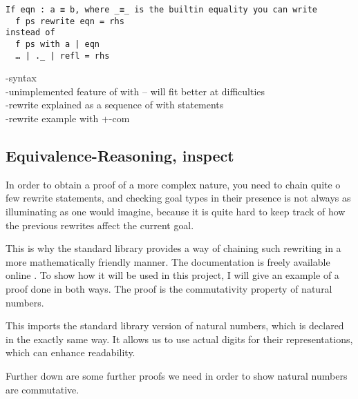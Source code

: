 \documentclass[12pt,twoside,notitlepage]{report}
\newcommand{\Conid}[1]{\mathit{#1}}
\newcommand{\Varid}[1]{\mathit{#1}}
\def\resethooks{%
  \global\let\SaveRestoreHook\empty
  \global\let\ColumnHook\empty}
\let\hspre\empty
\let\hspost\empty
\begin{document}
\begin{verbatim}
If eqn : a ≡ b, where _≡_ is the builtin equality you can write
  f ps rewrite eqn = rhs
instead of
  f ps with a | eqn
  … | ._ | refl = rhs
\end{verbatim}

-syntax\\
-unimplemented feature of with -- will fit better at difficulties\\
-rewrite explained as a sequence of with statements\\
-rewrite example with +-com

\subsection{Equivalence-Reasoning, inspect}

In order to obtain a proof of a more complex nature, you need to chain quite o few rewrite statements, and checking goal
types in their presence is not always as illuminating as one would imagine, because it is quite hard to keep track of
how the previous rewrites affect the current goal.

This is why the standard library provides a way of chaining such rewriting in a more mathematically friendly manner.
The documentation is freely available online \cite{agdadoc}. To show how it will be used in this project,
I will give an example of a proof done in both ways. The proof is the commutativity property of natural numbers.

\begin{hscode}\SaveRestoreHook
\column{B}{@{}>{\hspre}l<{\hspost}@{}}%
\column{3}{@{}>{\hspre}l<{\hspost}@{}}%
\column{E}{@{}>{\hspre}l<{\hspost}@{}}%
\>[3]{}\Varid{open}\;\;\Conid{\Conid{Data}.Nat}{}\<[E]%
\ColumnHook
\end{hscode}\resethooks

  This imports the standard library version of natural numbers, which is declared in the exactly same way.
  It allows us to use actual digits for their representations, which can enhance readability.

  Further down are some further proofs we need in order to show natural numbers are commutative.
\end{document}
